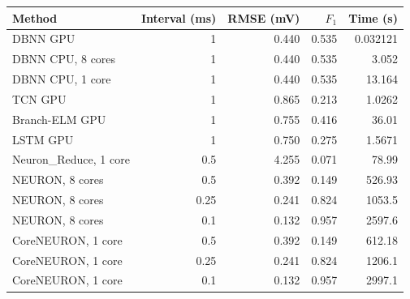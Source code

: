 \begin{tabular}{lrrrr}
\toprule
Method & Interval (ms) & RMSE (mV) & $F_1$ & Time (s)\\
\midrule
DBNN GPU & 1 & 0.440 & 0.535 & 0.032121 \\
DBNN CPU, 8 cores & 1 & 0.440 & 0.535 & 3.052 \\
DBNN CPU, 1 core & 1 & 0.440 & 0.535 & 13.164 \\
TCN GPU \cite{beniaguev2021} & 1 & 0.865 & 0.213 & 1.0262 \\
Branch-ELM GPU \cite{spieler2024} & 1 & 0.755 & 0.416 & 36.01 \\
LSTM GPU \cite{hochreiter1997,spieler2024} & 1 & 0.750 & 0.275 & 1.5671 \\
Neuron\_Reduce, 1 core \cite{amsalem2020} & 0.5 & 4.255 & 0.071 & 78.99 \\
NEURON, 8 cores \cite{hines1997,hines2008} & 0.5 & 0.392 & 0.149 & 526.93 \\
NEURON, 8 cores \cite{hines1997,hines2008} & 0.25 & 0.241 & 0.824 & 1053.5 \\
NEURON, 8 cores \cite{hines1997,hines2008} & 0.1 & 0.132 & 0.957 & 2597.6 \\
CoreNEURON, 1 core \cite{kumbhar2019} & 0.5 & 0.392 & 0.149 & 612.18 \\
CoreNEURON, 1 core \cite{kumbhar2019} & 0.25 & 0.241 & 0.824 & 1206.1 \\
CoreNEURON, 1 core \cite{kumbhar2019} & 0.1 & 0.132 & 0.957 & 2997.1 \\
\bottomrule
\end{tabular}

